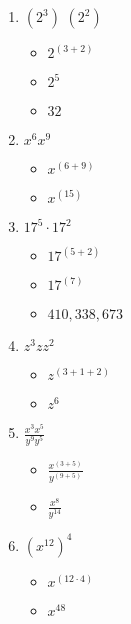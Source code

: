 \documentclass{article}
\begin{document}
\begin{onehalfspace}
    \begin{enumerate}
        \item $\left( 2^{3} \right)$ $\left( 2^{2} \right)$
        \begin{itemize}
            \item $2^{(3 + 2)}$
            \item $2^{5}$
            \item $32$
        \end{itemize}
        

        \item $x^{6}x^{9}$
        \begin{itemize}
            \item $x^{(6 + 9)}$
            \item $x^{(15)}$
        \end{itemize}
        

        \item $17^{5} \cdot 17^{2}$
        \begin{itemize}
            \item $17^{(5 + 2)}$
            \item $17^{(7)}$
            \item $410,338,673$
        \end{itemize}
        

        \item $z^{3}zz^{2}$
        \begin{itemize}
            \item $z^{(3 + 1 + 2)}$
            \item $z^{6}$
        \end{itemize}
        

        \item $\frac{x^{3}x^{5}}{y^{9}y^{5}}$
        \begin{itemize}
            \item $\frac{x^{(3 + 5)}}{y^{(9 + 5)}}$
            \item $\frac{x^{8}}{y^{14}}$
        \end{itemize}
        

        \item $\left( x^{12} \right)^{4}$
        \begin{itemize}
            \item $x^{(12 \cdot 4)}$
            \item $x^{48}$
        \end{itemize}
        


\end{enumerate}
\end{onehalfspace}
\end{document}
